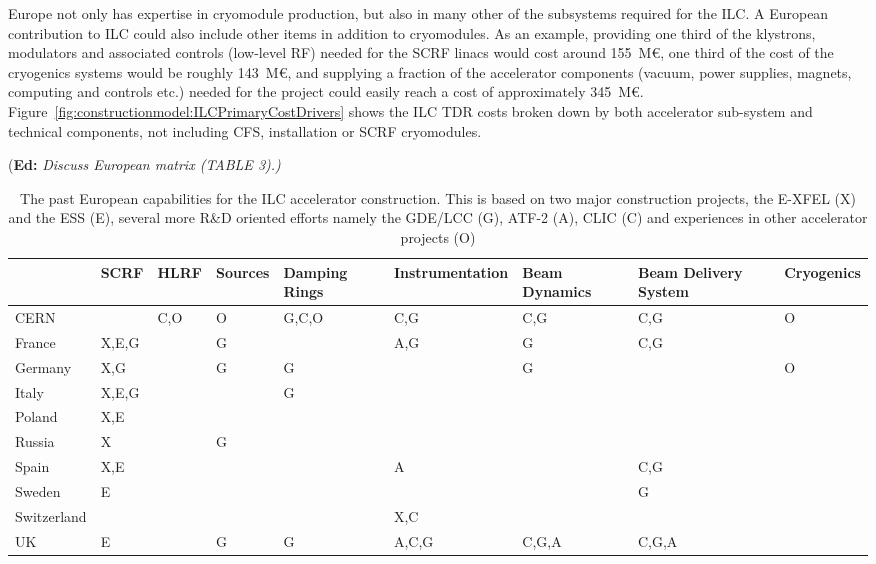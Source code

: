 \documentclass[%
 reprint,
 floatfix,
 amsmath,amssymb,
 aps,
]{revtex4-1}
\newif\ifEdNotes \EdNotestrue
\newcommand{\doednote}[1]{{\color{red}(\textbf{Ed:} \textit{#1)}}}
\newcommand{\ednote}[1]{\ifEdNotes 
  \doednote{#1} 
\fi}
\newcommand\Tstrut{\rule{0pt}{2.9ex}}         %
\begin{document}
Europe not only has expertise in cryomodule production, but also in many other 
of the subsystems required for the ILC. A European contribution to ILC could 
also include other items in addition to cryomodules. As an example, providing 
one third of the klystrons, modulators and associated controls (low-level RF) 
needed for the SCRF linacs would cost around 155~M\euro{}, one third of the cost of 
the cryogenics systems would be roughly 143~M\euro{}, and supplying a fraction of the 
accelerator components (vacuum, power supplies, magnets, computing and controls 
etc.) needed for the project could easily reach a cost of approximately 345~M\euro{}. 
Figure~\ref{fig:constructionmodel:ILCPrimaryCostDrivers} shows the ILC TDR costs broken down by both accelerator sub-system and 
technical components, not including CFS, installation or SCRF cryomodules.

\ednote{Discuss European matrix (TABLE 3).}

\begin{table}

\begin{tabular}{l|C{1.8cm}|C{1.8cm}|C{1.8cm}|C{1.8cm}|C{1.8cm}|C{1.8cm}|C{1.8cm}|C{1.8cm}|}
  	&\bfseries SCRF	& \bfseries HLRF	&\bfseries Sources&\bfseries Damping Rings	&\bfseries Instru\-mentation&\bfseries Beam Dynamics	&\bfseries Beam Delivery System	&\bfseries Cryogenics \\\hline\Tstrut
CERN	&	&C,O	&O	&G,C,O		&C,G		&C,G		&C,G			&O\\
France	&X,E,G	&	&G	&		&A,G		&G		&C,G			&\\
Germany	&X,G	&	&G	&G		&		&G		&			&O\\
Italy	&X,E,G	&	&	&G		&		&		&			&\\
Poland	&X,E	&	&	&		&		&		&			&\\
Russia	&X	&	&G	&		&		&		&			&\\
Spain	&X,E	&	&	&		&A		&		&C,G			&\\
Sweden	&E	&	&	&		&		&		&G			&\\
Switzerland& 	&	&	&		&X,C		&		&			&\\
UK	&E	&	&G	&G		&A,C,G		&C,G,A		&C,G,A			&\\ \hline
\end{tabular}

\caption{The past European capabilities for the ILC accelerator construction. This is based on two major construction projects, the  E-XFEL (X) and the ESS (E),  
several more R\&D oriented efforts namely the GDE/LCC (G), ATF-2 (A), CLIC (C) and  experiences in other accelerator projects (O)}
\end{table}
\end{document}
